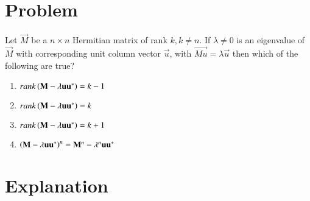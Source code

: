 \documentclass[journal,12pt,twocolumn]{IEEEtran}
\begin{document}
\section{Problem}
Let $\vec{M}$ be a $n\times n$ Hermitian matrix of rank $k,k\neq n$. If $\lambda\neq 0$ is
an eigenvalue of $\vec{M}$ with corresponding unit column vector $\vec{u}$,
with $\vec{Mu}=\lambda\vec{u}$ then which of the following are true?
\begin{enumerate}
	\item $rank\left(\mathbf{M}-\lambda\mathbf{uu^*}\right)=k-1$
	\item $rank\left(\mathbf{M}-\lambda\mathbf{uu^*}\right)=k$
	\item $rank\left(\mathbf{M}-\lambda\mathbf{uu^*}\right)=k+1$
	\item $\left(\mathbf{M}-\lambda\mathbf{uu^*}\right)^n=\mathbf{M}^n-\lambda^n\mathbf{uu^*}$
\end{enumerate}

\section{Explanation}
\end{document}
